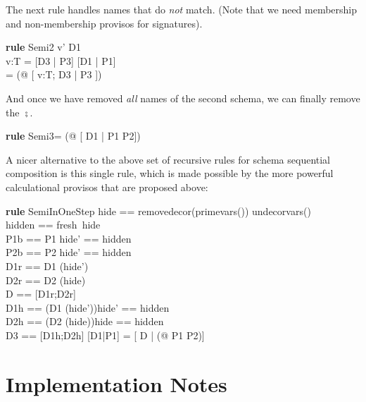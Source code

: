 \documentclass{article}
\newenvironment{zedrule}[1]{\par\textbf{rule }#1\vspace{-2ex}\infrule}{\endinfrule}
\newcommand{\derives}{\derive{}}
\newcommand{\substitute}{\mathrel{\curvearrowleft}}  %
\newcommand{\proviso}{\raisebox{0.5ex}{${}_{\blacktriangleright}\ $}}%
\begin{document}
The next rule handles names that do \emph{not} match. 
(Note that we need membership and non-membership provisos for signatures).
\begin{zedrule}{Semi2}
  \proviso v' \not\in D1 \\
  v:T \vdash [D1 | P1] \semi [D2 | P2] = [D3 | P3]
\derives
  [D1 | P1] \semi [v:T ; D2 | P2]\\
    = (\exists [] @ [ v:T; D3 | P3 ])
\end{zedrule}

And once we have removed \emph{all} names of the second
schema, we can finally remove the $\semi$.
\begin{zedrule}{Semi3}
  [D1 | P1] \semi [~|P2] = (\exists [] @ [ D1 | P1 \land P2])
\end{zedrule}

A nicer alternative to the above set of recursive rules for
schema sequential composition is this single rule, which is
made possible by the more powerful calculational provisos that
are proposed above:

\begin{zedrule}{SemiInOneStep}
  \proviso hide == removedecor(primevars(\alpha[D1])) 
                   \cap undecorvars(\alpha[D2]) \\
  \proviso hidden == fresh~hide \\
  \proviso P1b == P1 \substitute \lblot hide' == hidden \rblot \\
  \proviso P2b == P2 \substitute \lblot hide' == hidden \rblot \\
  \proviso D1r == D1 \hide (hide') \\
  \proviso D2r == D2 \hide (hide) \\
  \proviso D == [D1r;D2r] \\
  \proviso D1h == (D1 \filter(hide'))\substitute\lblot hide' == hidden \rblot\\
  \proviso D2h == (D2 \filter(hide))\substitute\lblot hide == hidden \rblot\\
  \proviso D3 == [D1h;D2h]
  \derives
  [D1|P1] \semi [D2|P2] = [ D | (\exists [D3] @ P1 \land P2)] 
\end{zedrule}



\section{Implementation Notes}
\end{document}
